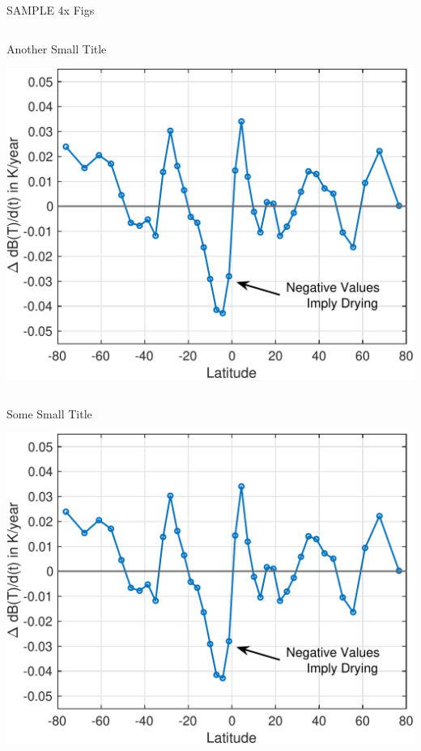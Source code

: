 \documentclass[10pt,t]{beamer}
\begin{document}
\begin{frame}[label={sec:orgd2a29c0}]{SAMPLE 4x Figs}
\begin{columns}
\begin{column}{0.45\columnwidth}
\begin{block}{\footnotesize Another Small Title}
\vspace{-0.1in}
\begin{center}
\includegraphics[width=\linewidth]{./Figs/Pdf/drying_in_convective_regions_v2.pdf}
\end{center}
\end{block}
\end{column}
\end{columns}

\vspace{-0.25in}

\begin{columns}
\begin{column}{0.45\columnwidth}
\begin{block}{\footnotesize Some Small Title}
\vspace{-0.1in}
\begin{center}
\includegraphics[width=\linewidth]{./Figs/Pdf/drying_in_convective_regions_v2.pdf}
\end{center}
\end{block}
\end{column}


\end{columns}
\end{frame}
\end{document}
